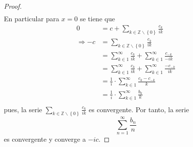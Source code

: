 \documentclass[12pt]{report}
\theoremstyle{largebreak}
\begin{document}
\begin{proof}
\begin{equation*}
\begin{split}
            \end{split}
        \end{equation*}
        En particular para $x=0$ se tiene que
        \begin{equation*}
            \begin{split}
                0&=c+\sum_{ k\in\mathbb{Z}\backslash\left\{0\right\}}\frac{c_k}{ik}\\
                \Rightarrow -c&=\sum_{ k\in\mathbb{Z}\backslash\left\{0\right\}}\frac{c_k}{ik}\\
                &=\sum_{k\in1}^\infty\frac{c_k}{ik}+\sum_{k\in1}^\infty\frac{c_{-k}}{-ik}\\
                &=\sum_{k\in1}^\infty\frac{c_k}{ik}+\sum_{k\in1}^\infty\frac{-c_{-k}}{ik}\\
                &=\frac{1}{i}\cdot\sum_{k\in1}^\infty\frac{c_k-c_{ -k}}{k}\\
                &=\frac{1}{i}\cdot\sum_{k\in1}^\infty\frac{b_k}{k}\\
            \end{split}
        \end{equation*}
        pues, la serie $\sum_{ k\in\mathbb{Z}\backslash\left\{0\right\}}\frac{c_k}{ik}$ es convergente. Por tanto, la serie
        \begin{equation*}
            \sum_{ n=1}^\infty\frac{b_n}{n}
        \end{equation*}
        es convergente y converge a $-ic$.


\end{proof}
\end{document}
